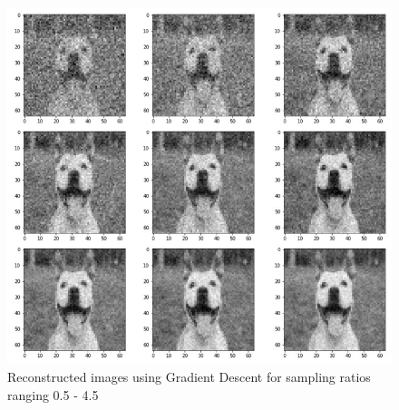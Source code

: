 \documentclass[conference]{IEEEtran}
\begin{document}
\begin{itemize}
\begin{figure}[ht]
        \includegraphics[scale=0.55]{figures/gd_sampling_ratio.jpg}
        \caption{Reconstructed images using Gradient Descent for sampling ratios ranging 0.5 - 4.5}
        \label{fig:gd_sampling_ratio} 
        

\end{figure}
\end{itemize}
\end{document}
